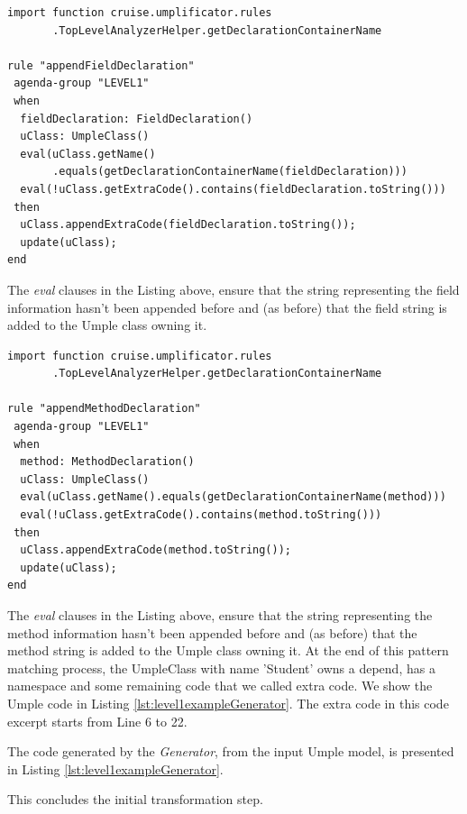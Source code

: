 \begin{lstlisting}[language={drools},label={lst:appendField}, caption=Rule appendFieldDeclaration]
import function cruise.umplificator.rules
       .TopLevelAnalyzerHelper.getDeclarationContainerName
       
rule "appendFieldDeclaration"
 agenda-group "LEVEL1" 
 when
  fieldDeclaration: FieldDeclaration()
  uClass: UmpleClass()
  eval(uClass.getName()
       .equals(getDeclarationContainerName(fieldDeclaration)))
  eval(!uClass.getExtraCode().contains(fieldDeclaration.toString()))
 then
  uClass.appendExtraCode(fieldDeclaration.toString());
  update(uClass);
end
\end{lstlisting}

The \textit{eval} clauses in the Listing above, ensure that the string representing the field information hasn't been appended before and (as before) that the field string is added to the Umple class owning it.


\begin{lstlisting}[language={drools},label={lst:appendMethod}, caption=Rule appendMethodDeclaration]
import function cruise.umplificator.rules
       .TopLevelAnalyzerHelper.getDeclarationContainerName
       
rule "appendMethodDeclaration"
 agenda-group "LEVEL1" 
 when
  method: MethodDeclaration()
  uClass: UmpleClass()
  eval(uClass.getName().equals(getDeclarationContainerName(method)))
  eval(!uClass.getExtraCode().contains(method.toString()))
 then
  uClass.appendExtraCode(method.toString());
  update(uClass);
end
\end{lstlisting}

The \textit{eval} clauses in the Listing above, ensure that the string representing the method information hasn't been appended before and (as before) that the method string is added to the Umple class owning it. 
At the end of this pattern matching process, the UmpleClass with name 'Student' owns a depend, has a namespace and some remaining code that we called extra code. We show the Umple code in Listing \ref{lst:level1exampleGenerator}. The extra code in this code excerpt starts from Line 6 to 22.

The code generated by the \textit{Generator}, from the input Umple model, is presented in Listing \ref{lst:level1exampleGenerator}. 

This concludes the initial transformation step.

